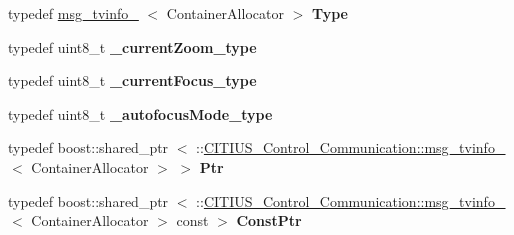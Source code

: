 \begin{DoxyCompactItemize}
\item 
\hypertarget{struct_c_i_t_i_u_s___control___communication_1_1msg__tvinfo___ab431f8b7b7e29e29aef89a9fe8f7bb5e}{typedef \hyperlink{struct_c_i_t_i_u_s___control___communication_1_1msg__tvinfo__}{msg\-\_\-tvinfo\-\_\-}\*
$<$ \-Container\-Allocator $>$ {\bfseries \-Type}}\label{struct_c_i_t_i_u_s___control___communication_1_1msg__tvinfo___ab431f8b7b7e29e29aef89a9fe8f7bb5e}

\item 
\hypertarget{struct_c_i_t_i_u_s___control___communication_1_1msg__tvinfo___ac36cd80053b3c37cc869c82339610460}{typedef uint8\-\_\-t {\bfseries \-\_\-current\-Zoom\-\_\-type}}\label{struct_c_i_t_i_u_s___control___communication_1_1msg__tvinfo___ac36cd80053b3c37cc869c82339610460}

\item 
\hypertarget{struct_c_i_t_i_u_s___control___communication_1_1msg__tvinfo___ae23b0c7cb5f1f37e1561e9e3a4b16a63}{typedef uint8\-\_\-t {\bfseries \-\_\-current\-Focus\-\_\-type}}\label{struct_c_i_t_i_u_s___control___communication_1_1msg__tvinfo___ae23b0c7cb5f1f37e1561e9e3a4b16a63}

\item 
\hypertarget{struct_c_i_t_i_u_s___control___communication_1_1msg__tvinfo___a8c2cd637553af1cd24edb193bc3fb01e}{typedef uint8\-\_\-t {\bfseries \-\_\-autofocus\-Mode\-\_\-type}}\label{struct_c_i_t_i_u_s___control___communication_1_1msg__tvinfo___a8c2cd637553af1cd24edb193bc3fb01e}

\item 
\hypertarget{struct_c_i_t_i_u_s___control___communication_1_1msg__tvinfo___a050970ae2c1146636f1038d34b966438}{typedef boost\-::shared\-\_\-ptr\*
$<$ \-::\hyperlink{struct_c_i_t_i_u_s___control___communication_1_1msg__tvinfo__}{\-C\-I\-T\-I\-U\-S\-\_\-\-Control\-\_\-\-Communication\-::msg\-\_\-tvinfo\-\_\-}\*
$<$ \-Container\-Allocator $>$ $>$ {\bfseries \-Ptr}}\label{struct_c_i_t_i_u_s___control___communication_1_1msg__tvinfo___a050970ae2c1146636f1038d34b966438}

\item 
\hypertarget{struct_c_i_t_i_u_s___control___communication_1_1msg__tvinfo___abf082fc18de2708e262a6f4e0cc88501}{typedef boost\-::shared\-\_\-ptr\*
$<$ \-::\hyperlink{struct_c_i_t_i_u_s___control___communication_1_1msg__tvinfo__}{\-C\-I\-T\-I\-U\-S\-\_\-\-Control\-\_\-\-Communication\-::msg\-\_\-tvinfo\-\_\-}\*
$<$ \-Container\-Allocator $>$ const  $>$ {\bfseries \-Const\-Ptr}}\label{struct_c_i_t_i_u_s___control___communication_1_1msg__tvinfo___abf082fc18de2708e262a6f4e0cc88501}

\end{DoxyCompactItemize}
